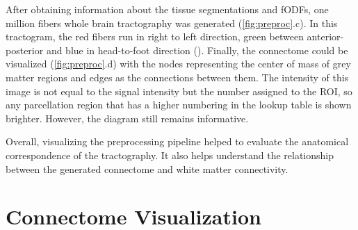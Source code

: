 \documentclass[msthesis.tex]{subfiles}
\begin{document}
After obtaining information about the tissue segmentations and fODFs, one million fibers whole brain tractography was generated (\autoref{fig:preproc}.c). In this tractogram, the red fibers run in right to left direction, green between anterior-posterior and blue in head-to-foot direction (\cite{obert2013evaluation}). Finally, the connectome could be visualized (\autoref{fig:preproc}.d) with the nodes representing the center of mass of grey matter regions and edges as the connections between them. The intensity of this image is not equal to the signal intensity but the number assigned to the ROI, so any parcellation region that has a higher numbering in the lookup table is shown brighter. However, the diagram still remains informative. 

Overall, visualizing the preprocessing pipeline helped to evaluate the anatomical correspondence of the tractography. It also helps understand the relationship between the generated connectome and white matter connectivity.

\section{Connectome Visualization}
\end{document}

